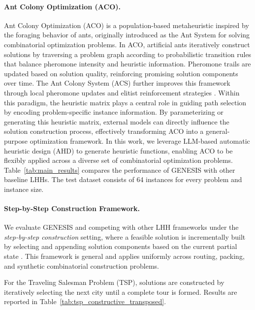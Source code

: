 \documentclass[sigconf,anonymous]{aamas}
\begin{document}
\paragraph{Ant Colony Optimization (ACO).}
Ant Colony Optimization (ACO) is a population-based metaheuristic inspired by the foraging behavior of ants, originally introduced as the Ant System \cite{dorigo1996ant} for solving combinatorial optimization problems. In ACO, artificial ants iteratively construct solutions by traversing a problem graph according to probabilistic transition rules that balance pheromone intensity and heuristic information. Pheromone trails are updated based on solution quality, reinforcing promising solution components over time. The Ant Colony System (ACS) further improves this framework through local pheromone updates and elitist reinforcement strategies \cite{dorigo1997ant}. Within this paradigm, the heuristic matrix plays a central role in guiding path selection by encoding problem-specific instance information. By parameterizing or generating this heuristic matrix, external models can directly influence the solution construction process, effectively transforming ACO into a general-purpose optimization framework. In this work, we leverage LLM-based automatic heuristic design (AHD) to generate heuristic functions, enabling ACO to be flexibly applied across a diverse set of combinatorial optimization problems. Table~\ref{tab:main_results} compares the performance of GENESIS with other baseline LHHs. The test dataset consists of 64 instances for every problem and instance size.



\iffalse
\paragraph{Step-by-Step Construction Framework.}

We evaluate GENESIS and competing with other LHH frameworks under the \emph{step-by-step construction} setting, where a feasible solution is incrementally built by selecting and appending solution components based on the current partial state \cite{asani2023convexhull,bello2017neuralcombinatorialoptimizationreinforcement}. This framework is general and applies uniformly across routing, packing, and synthetic combinatorial construction problems.


For the Traveling Salesman Problem (TSP), solutions are constructed by iteratively selecting the next city until a complete tour is formed. Results are reported in Table~\ref{tab:tsp_constructive_transposed}.
\end{document}
